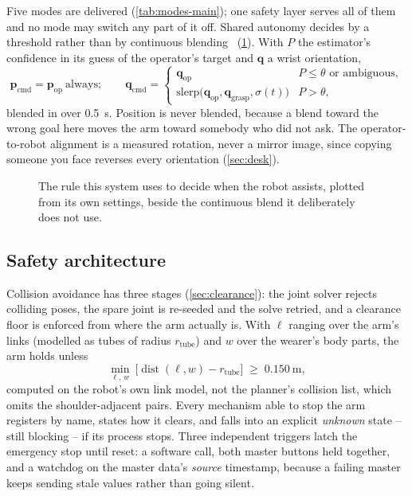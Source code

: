 Five modes are delivered (\cref{tab:modes-main}); one safety layer serves
all of them and no mode may switch any part of it off. Shared autonomy
decides by a threshold rather than by continuous
blending~\cite{dragan2013policyblending} (\cref{fig:arbitration}). With
$P$ the estimator's confidence in its guess of the operator's target and
$\mathbf{q}$ a wrist orientation,
\begin{equation}
  \mathbf{p}_{\text{cmd}} = \mathbf{p}_{\text{op}}\ \text{always};\qquad
  \mathbf{q}_{\text{cmd}} =
  \begin{cases}
    \mathbf{q}_{\text{op}} & P \le \theta \text{ or ambiguous},\\
    \mathrm{slerp}\bigl(\mathbf{q}_{\text{op}},\mathbf{q}_{\text{grasp}},\sigma(t)\bigr) & P > \theta,
  \end{cases}
  \label{eq:arb-main}
\end{equation}
blended in over \SI{0.5}{\second}. Position is never blended, because a
blend toward the wrong goal here moves the arm toward somebody who did not
ask. The operator-to-robot alignment is a measured rotation, never a mirror
image, since copying someone you face reverses every orientation
(\cref{sec:desk}).

\begin{figure}[htbp]
  \centering
  
  \caption[The assistance rule, against continuous blending]{The rule this
  system uses to decide when the robot assists, plotted from its own
  settings, beside the continuous blend it deliberately does not use.}
  \label{fig:arbitration}
\end{figure}

\subsection{Safety architecture}

Collision avoidance has three stages (\cref{sec:clearance}): the joint
solver rejects colliding poses, the spare joint is re-seeded and the solve
retried, and a clearance floor is enforced from where the arm actually is.
With $\ell$ ranging over the arm's links (modelled as tubes of radius
$r_{\text{tube}}$) and $w$ over the wearer's body parts, the arm holds
unless
\begin{equation}
  \min_{\ell,\,w}\ \bigl[\operatorname{dist}(\ell, w) - r_{\text{tube}}\bigr] \;\ge\; \SI{0.150}{\metre},
  \label{eq:floor-main}
\end{equation}
computed on the robot's own link model, not the planner's collision list,
which omits the shoulder-adjacent pairs. Every mechanism able to stop the arm
registers by name, states how it clears, and falls into an explicit
\emph{unknown} state -- still blocking -- if its process stops. Three
independent triggers latch the emergency stop until reset: a software call,
both master buttons held together, and a watchdog on the master data's
\emph{source} timestamp, because a failing master keeps sending stale values
rather than going silent.

